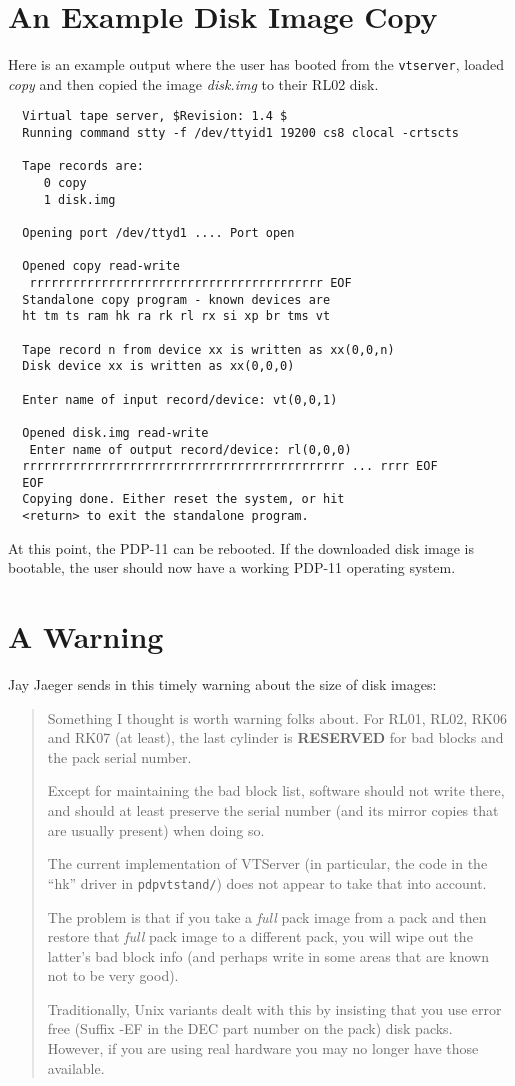 \section{An Example Disk Image Copy}

Here is an example output where the user has booted from the {\tt vtserver},
loaded {\it copy} and then copied the image {\it disk.img} to their RL02 disk.

\begin{verbatim}
  Virtual tape server, $Revision: 1.4 $ 
  Running command stty -f /dev/ttyid1 19200 cs8 clocal -crtscts

  Tape records are:
     0 copy
     1 disk.img

  Opening port /dev/ttyd1 .... Port open

  Opened copy read-write
   rrrrrrrrrrrrrrrrrrrrrrrrrrrrrrrrrrrrrrrrr EOF
  Standalone copy program - known devices are 
  ht tm ts ram hk ra rk rl rx si xp br tms vt 

  Tape record n from device xx is written as xx(0,0,n)
  Disk device xx is written as xx(0,0,0)

  Enter name of input record/device: vt(0,0,1)

  Opened disk.img read-write
   Enter name of output record/device: rl(0,0,0)
  rrrrrrrrrrrrrrrrrrrrrrrrrrrrrrrrrrrrrrrrrrrrr ... rrrr EOF
  EOF
  Copying done. Either reset the system, or hit
  <return> to exit the standalone program.
\end{verbatim}

At this point, the PDP-11 can be rebooted. If the downloaded disk image
is bootable, the user should now have a working PDP-11 operating system.

\section{A Warning}

Jay Jaeger sends in this timely warning about the size of disk images:

\begin{quote}
Something I thought is worth warning folks about.  For RL01, RL02, RK06 and 
RK07 (at least), the last cylinder is {\bf RESERVED}
for bad blocks and the pack serial number.

Except for maintaining the bad block list, software should not write there, 
and should at least preserve the serial number (and its mirror copies that 
are usually present) when doing so.

The current implementation of VTServer (in particular, the code in the ``hk'' 
driver in {\tt pdpvtstand/}) does not appear to take that into account.

The problem is that if you take a {\it full} pack image from a pack and then 
restore that {\it full} pack image to a different pack, you will wipe out the 
latter's bad block info (and perhaps write in some areas that are known not 
to be very good).

Traditionally, Unix variants dealt with this by insisting that you use 
error free (Suffix -EF in the DEC part number on the pack) disk 
packs.  However, if you are using real hardware you may no longer have 
those available.
\end{quote}

